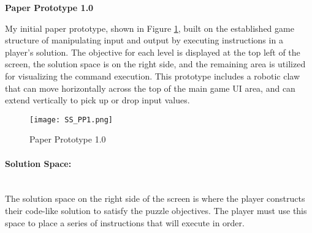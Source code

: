 \textbf{Paper Prototype 1.0}

My initial paper prototype, shown in Figure \ref{fig:Paper_Prototype_1.0}, built on the established game structure of manipulating input and output by executing instructions in a player's solution. The objective for each level is displayed at the top left of the screen, the solution space is on the right side, and the remaining area is utilized for visualizing the command execution. This prototype includes a robotic claw that can move horizontally across the top of the main game UI area, and can extend vertically to pick up or drop input values.

\begin{figure}[!hb]
  \caption{Paper Prototype 1.0}
  \label{fig:Paper_Prototype_1.0}
  \centering
  \texttt{[image: SS\_PP1.png]}
\end{figure}


\paragraph{Solution Space:} ~\\
The solution space on the right side of the screen is where the player constructs their code-like solution to satisfy the puzzle objectives.
The player must use this space to place a series of instructions that will execute in order.

